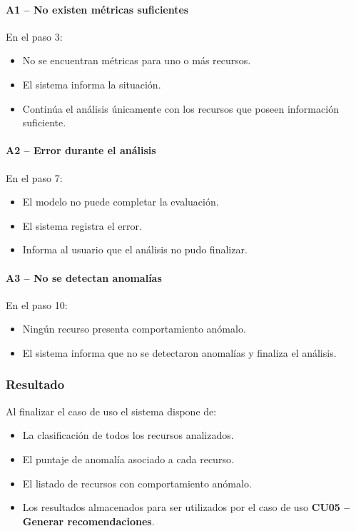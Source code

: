 \paragraph{A1 -- No existen métricas suficientes}

En el paso 3:

\begin{itemize}
\item No se encuentran métricas para uno o más recursos.
\item El sistema informa la situación.
\item Continúa el análisis únicamente con los recursos que poseen información suficiente.
\end{itemize}

\paragraph{A2 -- Error durante el análisis}

En el paso 7:

\begin{itemize}
\item El modelo no puede completar la evaluación.
\item El sistema registra el error.
\item Informa al usuario que el análisis no pudo finalizar.
\end{itemize}

\paragraph{A3 -- No se detectan anomalías}

En el paso 10:

\begin{itemize}
\item Ningún recurso presenta comportamiento anómalo.
\item El sistema informa que no se detectaron anomalías y finaliza el análisis.
\end{itemize}

\subsubsection*{Resultado}

Al finalizar el caso de uso el sistema dispone de:

\begin{itemize}
\item La clasificación de todos los recursos analizados.
\item El puntaje de anomalía asociado a cada recurso.
\item El listado de recursos con comportamiento anómalo.
\item Los resultados almacenados para ser utilizados por el caso de uso \textbf{CU05 -- Generar recomendaciones}.
\end{itemize}

